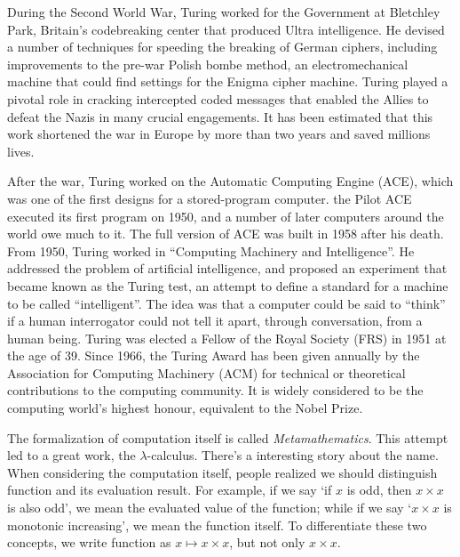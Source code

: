 \documentclass[b5paper]{article}
\begin{document}
During the Second World War, Turing worked for the Government at Bletchley Park, Britain's codebreaking center that produced Ultra intelligence. He devised a number of techniques for speeding the breaking of German ciphers, including improvements to the pre-war Polish bombe method, an electromechanical machine that could find settings for the Enigma cipher machine. Turing played a pivotal role in cracking intercepted coded messages that enabled the Allies to defeat the Nazis in many crucial engagements. It has been estimated that this work shortened the war in Europe by more than two years and saved millions lives.

After the war, Turing worked on the Automatic Computing Engine (ACE), which was one of the first designs for a stored-program computer. the Pilot ACE  executed its first program on 1950, and a number of later computers around the world owe much to it. The full version of ACE was built in 1958 after his death. From 1950, Turing worked in ``Computing Machinery and Intelligence''. He addressed the problem of artificial intelligence, and proposed an experiment that became known as the Turing test, an attempt to define a standard for a machine to be called ``intelligent''. The idea was that a computer could be said to ``think'' if a human interrogator could not tell it apart, through conversation, from a human being. Turing was elected a Fellow of the Royal Society (FRS) in 1951 at the age of 39. Since 1966, the Turing Award has been given annually by the Association for Computing Machinery (ACM) for technical or theoretical contributions to the computing community. It is widely considered to be the computing world's highest honour, equivalent to the Nobel Prize.

The formalization of computation itself is called {\em Metamathematics}. This attempt led to a great work, the $\lambda$-calculus. There's a interesting story about the name. When considering the computation itself, people realized we should distinguish function and its evaluation result. For example, if we say `if $x$ is odd, then $x \times x$ is also odd', we mean the evaluated value of the function; while if we say `$x \times x$ is monotonic increasing', we mean the function itself. To differentiate these two concepts, we write function as $x \mapsto x \times x$, but not only $x \times x$.
\end{document}
